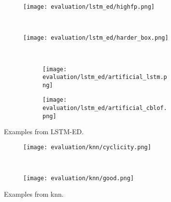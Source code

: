 \begin{figure}[htp!]
    \begin{subfigure}[b]{\linewidth}
        \centering
        \texttt{[image: evaluation/lstm\_ed/highfp.png]}
        \label{fig:lstmed-fp}
    \end{subfigure}%
    \\
    \begin{subfigure}[b]{\linewidth}
        \centering
        \texttt{[image: evaluation/lstm\_ed/harder\_box.png]}
        \label{fig:lstmed-harder}
    \end{subfigure}
    \\
    \begin{subfigure}[b]{\linewidth}
        \begin{subfigure}[b]{.45\linewidth}
            \centering
            \texttt{[image: evaluation/lstm\_ed/artificial\_lstm.png]}
        \end{subfigure}
        \hfill
        \begin{subfigure}[b]{.45\linewidth}
            \centering
            \texttt{[image: evaluation/lstm\_ed/artificial\_cblof.png]}
        \end{subfigure}
        \label{fig:lstmed-artificial}
    \end{subfigure}
\caption{Examples from LSTM-ED.}\label{fig:lstmed-output}
\end{figure}

\begin{figure}[htp!]
    \begin{subfigure}[b]{\linewidth}
        \centering
        \texttt{[image: evaluation/knn/cyclicity.png]}
        \label{fig:knn-cyclicity}
    \end{subfigure}%
    \\
    \begin{subfigure}[b]{\linewidth}
        \centering
        \texttt{[image: evaluation/knn/good.png]}
        \label{fig:knn-harder}
    \end{subfigure}
\caption{Examples from \gls{knn}.}\label{fig:knn-output}
\end{figure}




